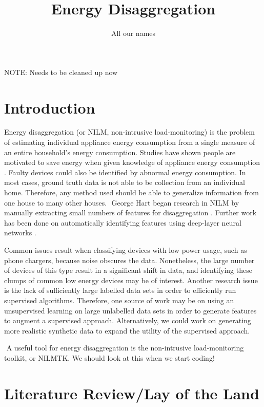 \documentclass{article}
\title{Energy Disaggregation}
\author{All our names}
\date{}
\begin{document}
\maketitle


NOTE: Needs to be cleaned up now

\section{Introduction}


Energy disaggregation (or NILM, non-intrusive load-monitoring) is the problem of estimating individual appliance energy consumption from a single measure of an entire household's energy consumption. Studies have shown people are motivated to save energy when given knowledge of appliance energy consumption \cite{Darby}. Faulty devices could also be identified by abnormal energy consumption. In most cases, ground truth data is not able to be collection from an individual home. Therefore, any method used should be able to generalize information from one house to many other houses.
​
George Hart began research in NILM by manually extracting small numbers of features for disaggregation \cite{Hart2, Hart1}. Further work has been done on automatically identifying features using deep-layer neural networks \cite{ Kelly}.

Common issues result when classifying devices with low power usage, such as phone chargers, because noise obscures the data. Nonetheless, the large number of devices of this type result in a significant shift in data, and identifying these clumps of common low energy devices may be of interest. Another research issue is the lack of sufficiently large labelled data sets in order to efficiently run supervised algorithms. Therefore, one source of work may be on using an unsupervised learning on large unlabelled data sets in order to generate features to augment a supervised approach. Alternatively, we could work on generating more realistic synthetic data to expand the utility of the supervised approach.

​
A useful tool for energy disaggregation is the non-intrusive load-monitoring toolkit, or NILMTK. We should look at this when we start coding!



\section{Literature Review/Lay of the Land}
\end{document}
